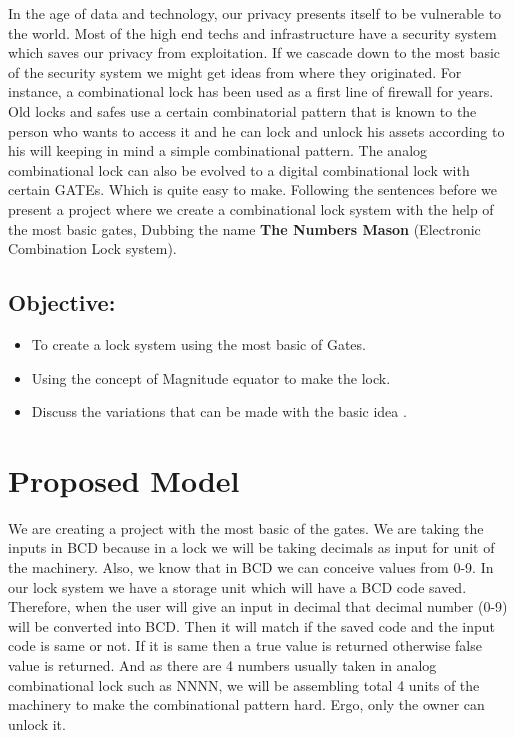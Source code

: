 \documentclass{article}
\begin{document}
\Large{

     In the age of data and technology, our privacy presents itself
     to be vulnerable to the world. Most of the high end techs and
     infrastructure have a security system which saves our privacy from
     exploitation. If we cascade down to the most basic of
     the security system we might get ideas from where they originated. 
     For instance, a  combinational lock has been used as a first
     line of firewall for years. Old locks  and safes use a certain
     combinatorial pattern that is known to the person who wants to
     access it and he can lock and unlock his  assets according to his
     will keeping in mind a simple combinational pattern. The analog
     combinational lock can also be evolved to a digital combinational
     lock with certain  GATEs.  Which is quite easy to make. Following
     the sentences before we present a project where we create a
     combinational lock system with the help of the most basic gates,
     Dubbing the name {\bf The Numbers Mason} (Electronic Combination Lock
     system).


    \subsection*{Objective:}

    \begin{itemize}
        \item To create a  lock system using the most basic of Gates.
        \item Using the concept of  Magnitude equator to make the lock.
        \item Discuss the variations that can be made with the basic idea .
    \end{itemize}

}


\vspace{1cm}

\section{Proposed Model}

\Large{

    We are creating a project with the most  basic of the gates. We are
    taking the inputs in BCD because in a lock we will be taking decimals  as
    input for unit of the machinery. Also, we know that  in BCD we can conceive values
    from 0-9. In our lock system we have a storage unit which will have  a BCD
    code  saved. Therefore, when the user will give an input in decimal that decimal
    number (0-9) will be converted into BCD. Then  it will match if the saved
    code and the  input code is same or  not. If it is same then  a true value
    is returned  otherwise false value is returned. And as there are 4
    numbers usually taken in  analog combinational lock such as NNNN, we will
    be assembling total 4 units of the machinery to make the combinational
    pattern hard. Ergo, only the owner can unlock it.

}
\end{document}
